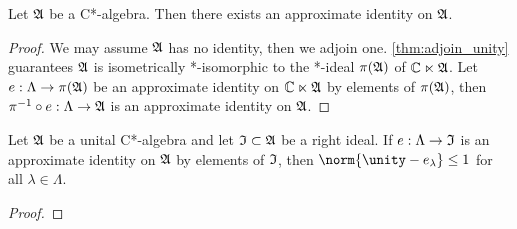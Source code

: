 \begin{corollary}
    Let \(\mathfrak{A}\) be a C*-algebra. Then there exists an approximate identity on \(\mathfrak{A}\).
\end{corollary}
\begin{proof}
    We may assume \(\mathfrak{A}\) has no identity, then we adjoin one. \cref{thm:adjoin_unity} guarantees \(\mathfrak{A}\) is isometrically *-isomorphic to the *-ideal \(\pi(\mathfrak{A})\) of \(\mathbb{C} \ltimes \mathfrak{A}\). Let \(e : \Lambda \to \pi(\mathfrak{A})\) be an approximate identity on \(\mathbb{C} \ltimes \mathfrak{A}\) by elements of \(\pi(\mathfrak{A})\), then \(\pi^{-1} \circ e : \Lambda \to \mathfrak{A}\) is an approximate identity on \(\mathfrak{A}\).
\end{proof}

\begin{lemma}{}{}
    Let \(\mathfrak{A}\) be a unital C*-algebra and let \(\mathfrak{I} \subset \mathfrak{A}\) be a right ideal. If \(e : \Lambda \to \mathfrak{I}\) is an approximate identity on \(\mathfrak{A}\) by elements of \(\mathfrak{I}\), then \(\norm{\unity - e_{\lambda}} \leq 1\) for all \(\lambda \in \Lambda\).
\end{lemma}
\begin{proof}

\end{proof}

